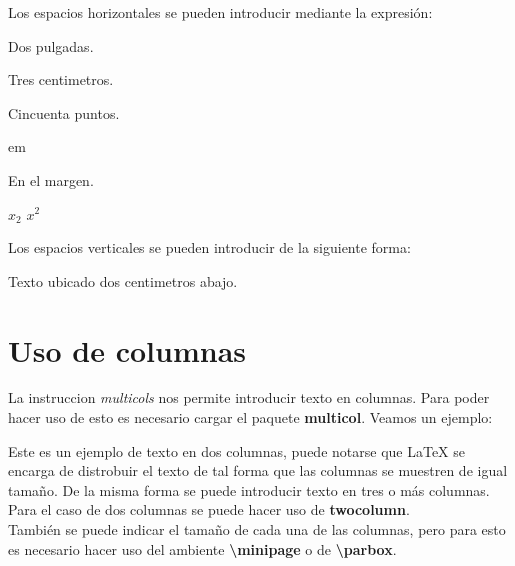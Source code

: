\documentclass[letterpaper,12pt]{book}
\begin{document}
Los espacios horizontales se pueden introducir mediante la expresión:

\hspace{2in}Dos pulgadas.

\hspace{3cm}Tres centimetros.
\hspace{3.5cm}

\hspace{50pt}Cincuenta puntos.

\hspace{3em} em

\hspace{-3cm}En el margen.

$x_{2}$ \hspace{4cm} $x^{2}$

Los espacios verticales se pueden introducir de la siguiente forma:

\vspace{2cm}Texto ubicado dos centimetros abajo.


\vspace{3cm}

\newpage
\chapter{Uso de columnas}

La instruccion \textit{multicols} nos permite introducir texto en columnas. Para poder hacer uso de esto es necesario cargar el paquete \textbf{multicol}. Veamos un ejemplo:

\begin{multicols}{4}
Este es  un ejemplo de texto en dos columnas, puede notarse que \LaTeX{} se encarga de distrobuir el texto de tal forma que las columnas se muestren de igual tamaño. De la misma forma se puede introducir texto en tres o más columnas.\\
Para el caso de dos columnas se puede hacer uso de \textbf{twocolumn}.\\
También se puede indicar el tamaño de cada una de las columnas, pero para esto es necesario hacer uso del ambiente \textbf{\textbackslash minipage} 
o de \textbf{\textbackslash parbox}.
\end{multicols}

\pagebreak
\end{document}
